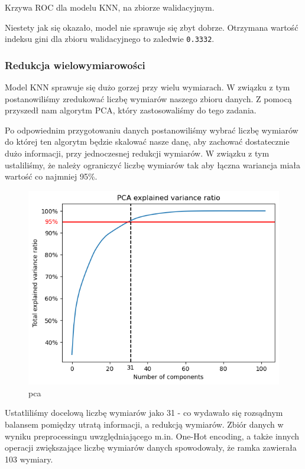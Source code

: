 \documentclass[11pt]{article}
\begin{document}
Krzywa ROC dla modelu KNN, na zbiorze walidacyjnym.

Niestety jak się okazało, model nie sprawuje się zbyt dobrze. Otrzymana
wartość indeksu gini dla zbioru walidacyjnego to zaledwie
\texttt{0.3332}.

\hypertarget{redukcja-wielowymiarowoux15bci}{%
\subsubsection{Redukcja
wielowymiarowości}\label{redukcja-wielowymiarowoux15bci}}

Model KNN sprawuje się dużo gorzej przy wielu wymiarach. W związku z tym
postanowiliśmy zredukować liczbę wymiarów naszego zbioru danych. Z
pomocą przyszedł nam algorytm PCA, który zastosowaliśmy do tego zadania.

Po odpowiednim przygotowaniu danych postanowiliśmy wybrać liczbę
wymiarów do której ten algorytm będzie skalować nasze danę, aby zachować
dostatecznie dużo informacji, przy jednoczesnej redukcji wymiarów. W
związku z tym ustaliliśmy, że należy ograniczyć liczbę wymiarów tak aby
łączna wariancja miała wartość co najmniej 95\%.

\begin{figure}
\centering
\includegraphics{plots/PCA_variance.png}
\caption{pca}
\end{figure}

Ustatliliśmy docelową liczbę wymiarów jako 31 - co wydawało się
rozsądnym balansem pomiędzy utratą informacji, a redukcją wymiarów.
Zbiór danych w wyniku preprocessingu uwzględniającego m.in. One-Hot
encoding, a także innych operacji zwiększające liczbę wymiarów danych
spowodowały, że ramka zawierała 103 wymiary.
\end{document}
